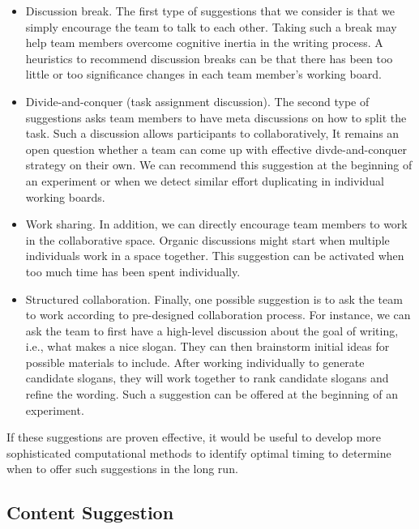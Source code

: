 \begin{itemize}[leftmargin=*]
    \item Discussion break. The first type of suggestions that we consider is that we simply encourage the team to talk to each other.
    Taking such a break may help team members overcome cognitive inertia in the writing process.
    A heuristics to recommend discussion breaks can be that there has been too little or too significance changes in each team member's working board.
    \item Divide-and-conquer (task assignment discussion).
    The second type of suggestions asks team members to have meta discussions on how to split the task.
    Such a discussion allows participants to collaboratively,
    It remains an open question whether a team can come up with effective divde-and-conquer strategy on their own.
    We can recommend this suggestion at the beginning of an experiment or when we detect similar effort duplicating in individual working boards.
    \item Work sharing. In addition, we can directly encourage team members to work in the collaborative space.
    Organic discussions might start when multiple individuals work in a space together.
    This suggestion can be activated when too much time has been spent individually.
    \item Structured collaboration.
    Finally, one possible suggestion is to ask the team to work according to pre-designed collaboration process.
    For instance, we can ask the team to first have a high-level discussion about the goal of writing, i.e., what makes a nice slogan.
    They can then brainstorm initial ideas for possible materials to include.
    After working individually to generate candidate slogans, they will work together to rank candidate slogans and refine the wording.
    Such a suggestion can be offered at the beginning of an experiment.
\end{itemize}

If these suggestions are proven effective, it would be useful to develop more sophisticated computational methods to identify optimal timing to determine when to offer such suggestions in the long run.

\subsection{Content Suggestion}
\label{sec:content}

